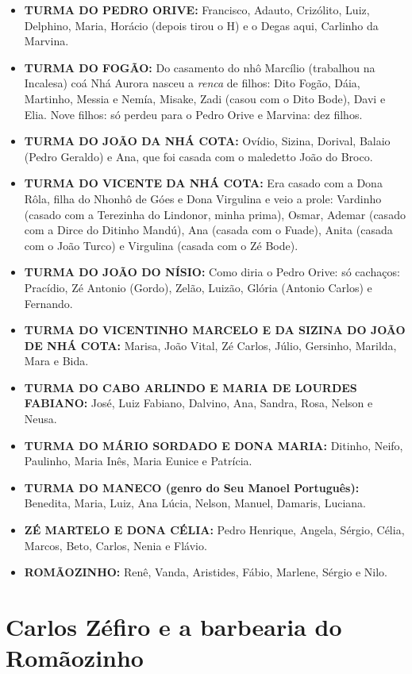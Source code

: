 \documentclass[12pt,brazil,]{book}
\providecommand{\tightlist}{%
  \setlength{\itemsep}{0pt}\setlength{\parskip}{0pt}}
\begin{document}
\begin{itemize}
\tightlist
\item
  \textbf{TURMA DO PEDRO ORIVE:} Francisco, Adauto, Crizólito, Luiz,
  Delphino, Maria, Horácio (depois tirou o H) e o Degas aqui, Carlinho
  da Marvina.\\
\item
  \textbf{TURMA DO FOGÃO:} Do casamento do nhô Marcílio (trabalhou na
  Incalesa) coá Nhá Aurora nasceu a \emph{renca} de filhos: Dito Fogão,
  Dáia, Martinho, Messia e Nemía, Misake, Zadi (casou com o Dito Bode),
  Davi e Elia. Nove filhos: só perdeu para o Pedro Orive e Marvina: dez
  filhos.
\item
  \textbf{TURMA DO JOÃO DA NHÁ COTA:} Ovídio, Sizina, Dorival, Balaio
  (Pedro Geraldo) e Ana, que foi casada com o maledetto João do Broco.
\item
  \textbf{TURMA DO VICENTE DA NHÁ COTA:} Era casado com a Dona Rôla,
  filha do Nhonhô de Góes e Dona Virgulina e veio a prole: Vardinho
  (casado com a Terezinha do Lindonor, minha prima), Osmar, Ademar
  (casado com a Dirce do Ditinho Mandú), Ana (casada com o Fuade), Anita
  (casada com o João Turco) e Virgulina (casada com o Zé Bode).
\item
  \textbf{TURMA DO JOÃO DO NÍSIO:} Como diria o Pedro Orive: só
  cachaços: Pracídio, Zé Antonio (Gordo), Zelão, Luizão, Glória (Antonio
  Carlos) e Fernando.
\item
  \textbf{TURMA DO VICENTINHO MARCELO E DA SIZINA DO JOÃO DE NHÁ COTA:}
  Marisa, João Vital, Zé Carlos, Júlio, Gersinho, Marilda, Mara e Bida.
\item
  \textbf{TURMA DO CABO ARLINDO E MARIA DE LOURDES FABIANO:} José, Luiz
  Fabiano, Dalvino, Ana, Sandra, Rosa, Nelson e Neusa.
\item
  \textbf{TURMA DO MÁRIO SORDADO E DONA MARIA:} Ditinho, Neifo,
  Paulinho, Maria Inês, Maria Eunice e Patrícia.
\item
  \textbf{TURMA DO MANECO (genro do Seu Manoel Português):} Benedita,
  Maria, Luiz, Ana Lúcia, Nelson, Manuel, Damaris, Luciana.
\item
  \textbf{ZÉ MARTELO E DONA CÉLIA:} Pedro Henrique, Angela, Sérgio,
  Célia, Marcos, Beto, Carlos, Nenia e Flávio.
\item
  \textbf{ROMÃOZINHO:} Renê, Vanda, Aristides, Fábio, Marlene, Sérgio e
  Nilo.
\end{itemize}

\section{Carlos Zéfiro e a barbearia do
Romãozinho}\label{carlos-zuxe9firo-e-a-barbearia-do-romuxe3ozinho}
\end{document}
